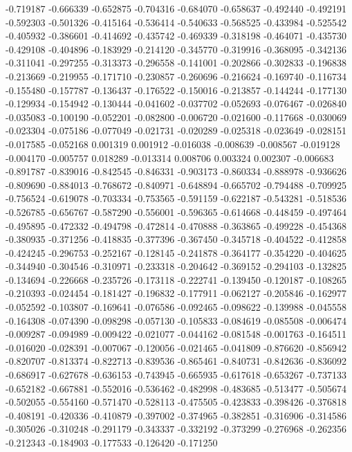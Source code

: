 -0.719187
-0.666339
-0.652875
-0.704316
-0.684070
-0.658637
-0.492440
-0.492191
-0.592303
-0.501326
-0.415164
-0.536414
-0.540633
-0.568525
-0.433984
-0.525542
-0.405932
-0.386601
-0.414692
-0.435742
-0.469339
-0.318198
-0.464071
-0.435730
-0.429108
-0.404896
-0.183929
-0.214120
-0.345770
-0.319916
-0.368095
-0.342136
-0.311041
-0.297255
-0.313373
-0.296558
-0.141001
-0.202866
-0.302833
-0.196838
-0.213669
-0.219955
-0.171710
-0.230857
-0.260696
-0.216624
-0.169740
-0.116734
-0.155480
-0.157787
-0.136437
-0.176522
-0.150016
-0.213857
-0.144244
-0.177130
-0.129934
-0.154942
-0.130444
-0.041602
-0.037702
-0.052693
-0.076467
-0.026840
-0.035083
-0.100190
-0.052201
-0.082800
-0.006720
-0.021600
-0.117668
-0.030069
-0.023304
-0.075186
-0.077049
-0.021731
-0.020289
-0.025318
-0.023649
-0.028151
-0.017585
-0.052168
0.001319
0.001912
-0.016038
-0.008639
-0.008567
-0.019128
-0.004170
-0.005757
0.018289
-0.013314
0.008706
0.003324
0.002307
-0.006683
-0.891787
-0.839016
-0.842545
-0.846331
-0.903173
-0.860334
-0.888978
-0.936626
-0.809690
-0.884013
-0.768672
-0.840971
-0.648894
-0.665702
-0.794488
-0.709925
-0.756524
-0.619078
-0.703334
-0.753565
-0.591159
-0.622187
-0.543281
-0.518536
-0.526785
-0.656767
-0.587290
-0.556001
-0.596365
-0.614668
-0.448459
-0.497464
-0.495895
-0.472332
-0.494798
-0.472814
-0.470888
-0.363865
-0.499228
-0.454368
-0.380935
-0.371256
-0.418835
-0.377396
-0.367450
-0.345718
-0.404522
-0.412858
-0.424245
-0.296753
-0.252167
-0.128145
-0.241878
-0.364177
-0.354220
-0.404625
-0.344940
-0.304546
-0.310971
-0.233318
-0.204642
-0.369152
-0.294103
-0.132825
-0.134694
-0.226668
-0.235726
-0.173118
-0.222741
-0.139450
-0.120187
-0.108265
-0.210393
-0.024454
-0.181427
-0.196832
-0.177911
-0.062127
-0.205846
-0.162977
-0.052592
-0.103807
-0.169641
-0.076586
-0.092465
-0.098622
-0.139988
-0.045558
-0.164308
-0.074390
-0.098298
-0.057130
-0.105833
-0.084619
-0.085508
-0.006474
-0.009287
-0.094989
-0.009422
-0.021077
-0.044162
-0.081548
-0.001763
-0.164511
-0.016020
-0.028391
-0.007067
-0.120056
-0.021465
-0.041809
-0.876620
-0.856942
-0.820707
-0.813374
-0.822713
-0.839536
-0.865461
-0.840731
-0.842636
-0.836092
-0.686917
-0.627678
-0.636153
-0.743945
-0.665935
-0.617618
-0.653267
-0.737133
-0.652182
-0.667881
-0.552016
-0.536462
-0.482998
-0.483685
-0.513477
-0.505674
-0.502055
-0.554160
-0.571470
-0.528113
-0.475505
-0.423833
-0.398426
-0.376818
-0.408191
-0.420336
-0.410879
-0.397002
-0.374965
-0.382851
-0.316906
-0.314586
-0.305026
-0.310248
-0.291179
-0.343337
-0.332192
-0.373299
-0.276968
-0.262356
-0.212343
-0.184903
-0.177533
-0.126420
-0.171250
